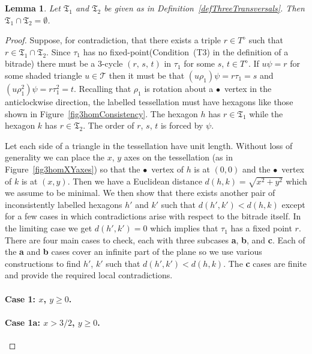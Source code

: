 \documentclass[amstags,fleqn,reqno]{article}
\theoremstyle{plain}
\newtheorem{lemma}[theorem]{Lemma}
\theoremstyle{definition}
\renewcommand\geq{\geqslant}
\newcommand{\fp}{fixed-point\xspace}
\newcommand{\Tfpf}{\textnormal{(T3)}\xspace}
\newcommand{\settriangles}{\mathcal{T}}
\newcommand{\triToT}{\psi}
\newcommand{\opa}{\diamond}
\newcommand{\blackvertex}{\bullet}
\newcommand{\transversal}{\mathfrak{T}}
\begin{document}
\begin{lemma}\label{3homPartition12}
Let $\transversal_1$ and $\transversal_2$ be given as in
Definition~\ref{defThreeTransversals}. Then
$\transversal_1 \cap \transversal_2 = \emptyset$.  
\end{lemma}

\begin{proof}
Suppose, for contradiction, that there exists a triple $r \in T^{\opa}$ such that
$r \in \transversal_1 \cap \transversal_2$. 
Since $\tau_1$ has no \fp (Condition~\Tfpf in the definition of
a bitrade) there must be a
$3$-cycle $(r,\, s,\, t)$ in $\tau_1$ for some $s$, $t \in T^{\opa}$. If 
$u \triToT = r$ for some shaded triangle $u \in \settriangles$
then it must be that
$(u \rho_1) \triToT = r \tau_1 = s$
and
$(u \rho_1^2) \triToT = r \tau_1^2 = t$.
Recalling that $\rho_1$ is rotation about a $\blackvertex$~vertex in the
anticlockwise direction, 
the labelled tessellation must have hexagons like those shown in 
Figure~\ref{fig3homConsistency}. 
The hexagon $h$ has $r \in \transversal_1$ while the hexagon $k$
has $r \in \transversal_2$. The order of $r$, $s$, $t$ is forced by $\triToT$.

Let each side of a triangle in the tessellation have unit length.
Without loss of
generality we can place the $x$, $y$ axes on the tessellation (as in
Figure~\ref{fig3homXYaxes}) so that the $\blackvertex$~vertex of $h$
is at $(0,0)$ and the $\blackvertex$~vertex of $k$ is at $(x,y)$.
Then we have a Euclidean distance
$d(h,k) = \sqrt{x^2 + y^2}$ which we assume to be minimal.  
We then show that there exists
another pair of inconsistently labelled hexagons $h'$ and $k'$ such that
$d(h',k') < d(h,k)$ except for a few cases in which contradictions
arise with respect to the bitrade itself. In the limiting case we get
$d(h',k') = 0$ which implies that $\tau_1$ has a fixed point $r$.
There are four main cases to check, each with three subcases
{\bf a}, {\bf b}, and {\bf c}.
Each of the {\bf a} and {\bf b} cases cover an infinite part of the plane
so we use various constructions to find $h'$, $k'$ such that
$d(h',k') < d(h,k)$. The {\bf c} cases are finite and provide the
required local contradictions.

\paragraph{Case 1: $x$, $y \geq 0$.}

\paragraph{Case 1a: $x > 3/2$, $y \geq 0$.}


\end{proof}
\end{document}
